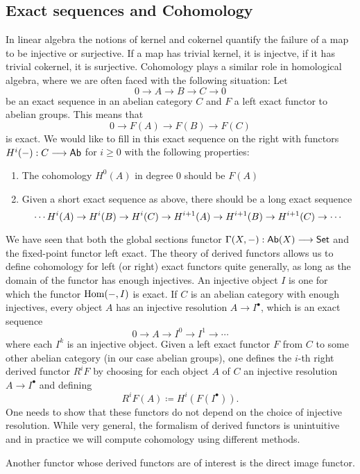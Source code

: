 \subsection{Exact sequences and Cohomology}

In linear algebra the notions of kernel and cokernel quantify the failure of a map to be injective or surjective. If a map has trivial kernel, it is injectve, if it has trivial cokernel, it is surjective. Cohomology plays a similar role in homological algebra, where we are often faced with the following situation:
Let
\[
	0 \to A \to B \to C \to 0
\]
be an exact sequence in an abelian category $C$ and $F$ a left exact functor to abelian groups. This means that
\[
	0 \to F(A) \to F(B) \to F(C)
\]
is exact. We  would like to fill in this exact sequence on the right with functors $H^i(-): C \longrightarrow \mathsf{Ab}$ for $i \ge 0$ with the following properties:
\begin{enumerate}
	\item The cohomology $H^0(A)$ in degree 0 should be $F(A)$
	\item Given a short exact sequence as above, there should be a long exact sequence
	      \[
		      \cdots H^i(A) \shortto H^i(B) \shortto H^i(C) \shortto H^{i+1}(A) \shortto H^{i+1}(B) \shortto H^{i+1}(C) \shortto \cdots
	      \]
\end{enumerate}

We have seen that both the global sections functor $\Gamma(X,-): \mathsf{Ab}(X) \longrightarrow \mathsf{Set}$ and the fixed-point functor left exact. The theory of derived functors allows us to define cohomology for left (or right) exact functors quite generally, as long as the domain of the functor has enough injectives. An injective object $I$ is one for which the functor $\operatorname{Hom}(-,I)$ is exact. If $C$ is an abelian category with enough injectives, every object $A$ has an injective resolution $A \to I^\bullet$, which is an exact sequence
\[
	0 \to A \to I^0 \to I^1 \to \cdots
\]
where each $I^k$ is an injective object. Given a left exact functor $F$ from $C$ to some other abelian category (in our case abelian groups), one defines the $i$-th right derived functor $R^i F$ by choosing for each object $A$ of $C$ an injective resolution $A \to I^\bullet$ and defining
\[
	R^i F(A) \coloneqq H^i(F(I^\bullet)).
\]
One needs to show that these functors do not depend on the choice of injective resolution. While very general, the formalism of derived functors is unintuitive and in practice we will compute cohomology using different methods.

Another functor whose derived functors are of interest is the direct image functor.

